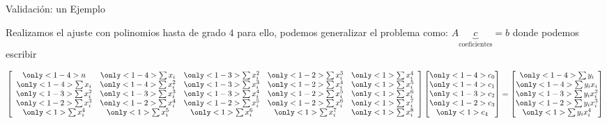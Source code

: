 \documentclass[xcolor=svgnames]{beamer} %
\theoremstyle{plain}
\theoremstyle{definition}
\begin{document}
\begin{frame}{Validación: un Ejemplo}

  Realizamos el ajuste con polinomios hasta de grado $4$ para ello, podemos generalizar el  problema como: $ A \underbrace{c}_{\text{coeficientes}} = b $
donde podemos escribir

\begin{minipage}{.7\linewidth}
$$  \left[\begin{array}{*5{c}}
    \only<1-4>{n} 			& \only<1-4>{\sum x_i}  	& \only<1-3>{\sum x_i^2}	& \only<1-2>{\sum x_i^3}	& \only<1>{\sum x_i^4}\\
	\only<1-4>{\sum x_i}		& \only<1-4>{\sum x_i^2}	& \only<1-3>{\sum x_i^3}	& \only<1-2>{\sum x_i^4}	& \only<1>{\sum x_i^5}\\
	\only<1-3>{\sum x_i^2} 	& \only<1-3>{\sum x_i^3}	& \only<1-3>{\sum x_i^4}	& \only<1-2>{\sum x_i^5}	& \only<1>{\sum x_i^6}\\
    \only<1-2>{\sum x_i^3} 	& \only<1-2>{\sum x_i^4}	& \only<1-2>{\sum x_i^5}	& \only<1-2>{\sum x_i^6}	& \only<1>{\sum x_i^7}\\
	\only<1>{\sum x_i^4}		& \only<1>{\sum x_i^5} 	& \only<1>{\sum x_i^6} 	& \only<1>{\sum x_i^7} 	& \only<1>{\sum x_i^8}
	\end{array}\right]  \begin{bmatrix}
	\only<1-4>{c_0}\\
	\only<1-4>{c_1}\\
	\only<1-3>{c_2}\\
	\only<1-2>{c_3}\\
	\only<1>{c_4}
\end{bmatrix} = \begin{bmatrix}
\only<1-4>{\sum y_i}\\
\only<1-4>{\sum y_i x_i}\\
\only<1-3>{\sum y_i x_i^2}\\
\only<1-2>{\sum y_i x_i^3}\\
\only<1>{\sum y_i x_i^4}
\end{bmatrix}	  $$
\end{minipage}
\end{frame}
\end{document}
